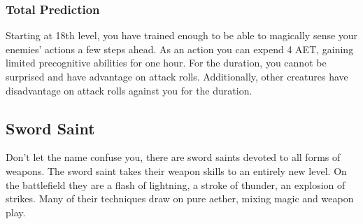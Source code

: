 \subsubsection{Total Prediction}
Starting at 18th level, you have trained enough to be able to magically sense your enemies' actions a few steps ahead. As an action you can expend 4 AET, gaining limited precognitive abilities for one hour. For the duration, you cannot be surprised and have advantage on attack rolls. Additionally, other creatures have disadvantage on attack rolls against you for the duration.

\subsection{Sword Saint}
Don't let the name confuse you, there are sword saints devoted to all forms of weapons. The sword saint takes their weapon skills to an entirely new level. On the battlefield they are a flash of lightning, a stroke of thunder, an explosion of strikes. Many of their techniques draw on pure aether, mixing magic and weapon play.


